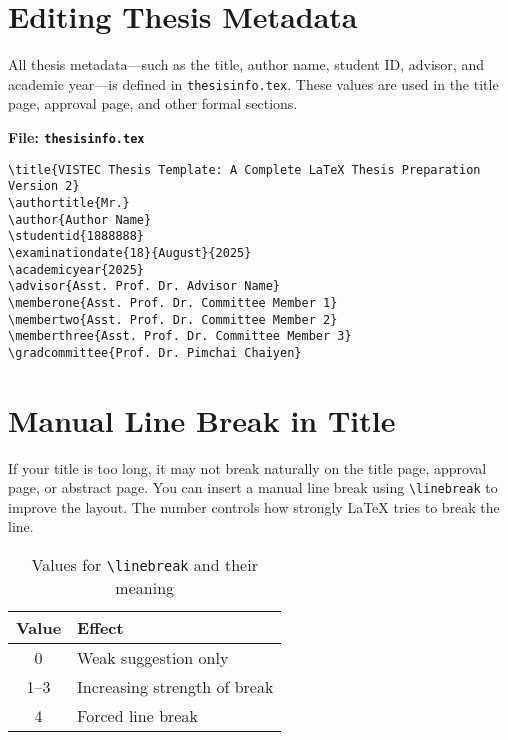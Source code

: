 \documentclass{VISTEC}
\begin{document}
\section{Editing Thesis Metadata}
\label{manual:metadata}

\begin{paragraph}
All thesis metadata—such as the title, author name, student ID, advisor, and academic year—is defined in \texttt{thesisinfo.tex}. These values are used in the title page, approval page, and other formal sections.
\end{paragraph}

\newpage

\noindent\textbf{File: \texttt{thesisinfo.tex}}\vspace{-1.5em}
\begin{verbatim}
\title{VISTEC Thesis Template: A Complete LaTeX Thesis Preparation Version 2}
\authortitle{Mr.}
\author{Author Name}
\studentid{1888888}
\examinationdate{18}{August}{2025}
\academicyear{2025}
\advisor{Asst. Prof. Dr. Advisor Name}
\memberone{Asst. Prof. Dr. Committee Member 1}
\membertwo{Asst. Prof. Dr. Committee Member 2}
\memberthree{Asst. Prof. Dr. Committee Member 3}
\gradcommittee{Prof. Dr. Pimchai Chaiyen}
\end{verbatim}

\section{Manual Line Break in Title}
\label{manual:metadata-linebreak}

\begin{paragraph}
If your title is too long, it may not break naturally on the title page, approval page, or abstract page. You can insert a manual line break using \verb|\linebreak| to improve the layout. The number controls how strongly LaTeX tries to break the line.
\end{paragraph}

\begin{table}[ht]
\small\singlespacingplus
\centering
\caption{Values for \texttt{\textbackslash linebreak} and their meaning}
\begin{tabular}{cl}
\toprule
\textbf{Value} & \textbf{Effect} \\
\midrule
0 & Weak suggestion only \\
1–3 & Increasing strength of break \\
4 & Forced line break \\
\bottomrule
\end{tabular}
\end{table}
\end{document}
